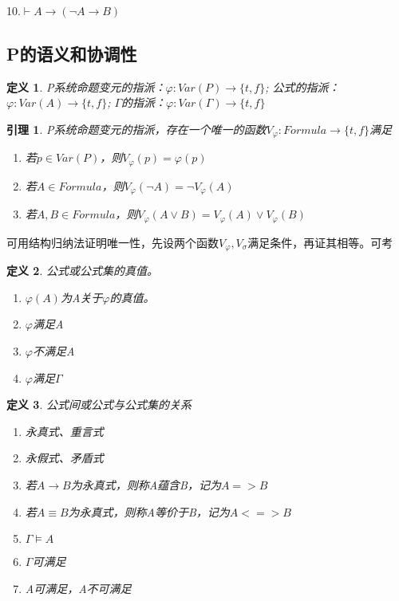 \documentclass[a4paper]{ctexart}
\newtheorem{lem}{\hspace{2em}引理}
\newtheorem{defi}{\hspace{2em}定义}[subsection]
\newcommand{\shade}[1]{\colorbox{shadecolor}{#1}}
\begin{document}
10.$\vdash A\rightarrow(\neg A\rightarrow B)$

\subsection{P的语义和协调性}
\begin{defi}
  P系统命题变元的指派：$\varphi:Var(P)\rightarrow\{t,f\}$; 公式的指派：$\varphi:Var(A)\rightarrow\{t,f\}$; $\Gamma$的指派：$\varphi:Var(\Gamma)\rightarrow\{t,f\}$
\end{defi}
\begin{lem}
  P系统命题变元的指派，存在一个唯一的函数$V_\varphi:Formula\rightarrow\{t,f\}$满足
  \begin{enumerate}[itemindent=2em]
    \item 若$p\in Var(P)$，则$V_\varphi(p)=\varphi(p)$ 
    \item 若$A\in Formula$，则$V_\varphi(\neg A)=\neg V_\varphi(A)$
    \item 若$A,B\in Formula$，则$V_\varphi(A\vee B)= V_\varphi(A)\vee V_\varphi(B)$
  \end{enumerate}
\end{lem}
可用结构归纳法证明唯一性，先设两个函数$V_\varphi,V_\sigma$满足条件，再证其相等。\shade{可考}

\begin{defi}
  公式或公式集的真值。
  \begin{enumerate}[itemindent=2em]
    \item $\varphi(A)$为A关于$\varphi$的真值。
    \item $\varphi$满足A
    \item $\varphi$不满足A
    \item $\varphi$满足$\Gamma$
  \end{enumerate}
\end{defi}

\begin{defi}
  公式间或公式与公式集的关系
  \begin{enumerate}[itemindent=2em]
    \item 永真式、重言式 
    \item 永假式、矛盾式
    \item 若$A\rightarrow B$为永真式，则称A蕴含B，记为$A=>B$
    \item 若$A\equiv B$为永真式，则称A等价于B，记为$A<=>B$
    \item $\Gamma\models A$
    \item $\Gamma$可满足
    \item A可满足，A不可满足
  \end{enumerate}
\end{defi}
\end{document}
